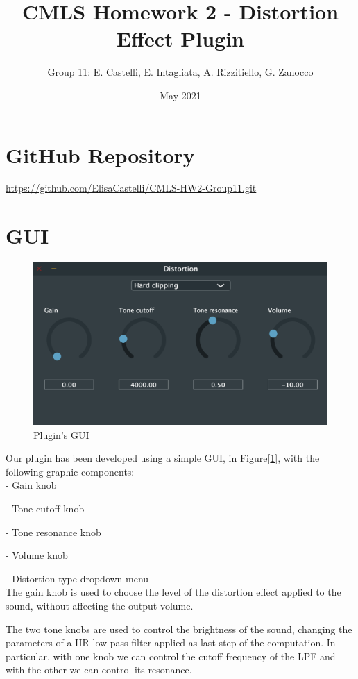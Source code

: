 \documentclass[letterpaper, 12pt]{article}
\begin{document}
	
	\title{CMLS Homework 2 - Distortion Effect Plugin}
	\author{Group 11: E. Castelli, E. Intagliata, A. Rizzitiello, G. Zanocco}
	\date{May 2021}
	\maketitle
	
	\section{GitHub Repository}
	\url{https://github.com/ElisaCastelli/CMLS-HW2-Group11.git}
	
	\section{GUI}
	
	\begin{figure}[h!]
		\includegraphics[scale=0.7]{gui.png}
		\centering
		\caption{Plugin's GUI}
		\label{fig:gui}
	\end{figure}

	Our plugin has been developed using a simple GUI, in Figure[\ref{fig:gui}], with the following graphic components:
	\\
	
	
	-	Gain knob 
	
	-	Tone cutoff knob 
	
	-	Tone resonance knob
	
	-	Volume knob
	
	-	Distortion type dropdown menu
	\\
	
	
	The gain knob is used to choose the level of the distortion effect applied to the sound, without affecting the output volume.
	
	The two tone knobs are used to control the brightness of the sound, changing the parameters of a IIR low pass filter applied as last step of the computation. In particular, with one knob we can control the cutoff frequency of the LPF and with the other we can control its resonance. 
	
\end{document}
